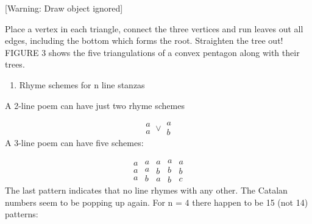 \documentclass{article}
\begin{document}
[Warning: Draw object ignored]

Place a vertex in each triangle, connect the three vertices and run leaves out all edges, including the bottom which
forms the root. Straighten the tree out! FIGURE 3 shows the five triangulations of a convex pentagon along with their
trees.

\begin{enumerate}
\item Rhyme schemes for n line stanzas
\end{enumerate}
A 2-line poem can have just two rhyme schemes

\begin{equation*}
\begin{matrix}a\\a\end{matrix}\vee \begin{matrix}a\\b\end{matrix}
\end{equation*}
A 3-line poem can have five schemes:

\begin{equation*}
\begin{matrix}a\\a\\a\end{matrix}\begin{matrix}a\\a\\b\end{matrix}\begin{matrix}a\\b\\a\end{matrix}\begin{matrix}a\\b\\b\end{matrix}\begin{matrix}a\\b\\c\end{matrix}
\end{equation*}
The last pattern indicates that no line rhymes with any other. The Catalan numbers seem to be popping up again. For n =
4 there happen to be 15 (not 14) patterns:
\end{document}
